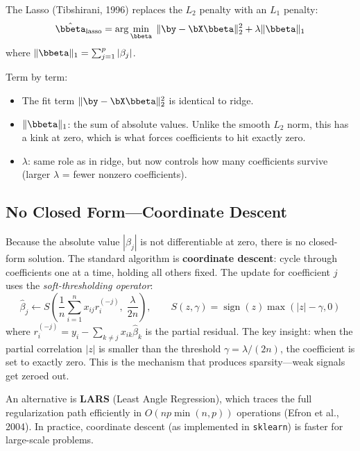 The Lasso (Tibshirani, 1996) replaces the $L_2$ penalty with an $L_1$ penalty:
\begin{equation}
\hat{\bbeta}_{\mathrm{lasso}} = \arg\min_{\bbeta} \; \| \by - \bX \bbeta \|_2^2 + \lambda \| \bbeta \|_1
\label{eq:lasso-objective}
\end{equation}
where $\| \bbeta \|_1 = \sum_{j=1}^p |\beta_j|$.

Term by term:
\begin{itemize}[nosep]
  \item The fit term $\| \by - \bX\bbeta \|_2^2$ is identical to ridge.
  \item $\| \bbeta \|_1$: the sum of absolute values. Unlike the smooth $L_2$ norm, this has a kink at zero, which is what forces coefficients to hit exactly zero.
  \item $\lambda$: same role as in ridge, but now controls how many coefficients survive (larger $\lambda$ = fewer nonzero coefficients).
\end{itemize}

\subsection{No Closed Form---Coordinate Descent}

Because the absolute value $|\beta_j|$ is not differentiable at zero, there is no closed-form solution.
The standard algorithm is \textbf{coordinate descent}: cycle through coefficients one at a time, holding all others fixed.
The update for coefficient $j$ uses the \emph{soft-thresholding operator}:
\begin{equation}
\hat{\beta}_j \leftarrow S\!\left(\frac{1}{n}\sum_{i=1}^n x_{ij} r_i^{(-j)}, \; \frac{\lambda}{2n}\right), \qquad S(z, \gamma) = \operatorname{sign}(z)\max(|z| - \gamma, 0)
\label{eq:soft-threshold}
\end{equation}
where $r_i^{(-j)} = y_i - \sum_{k \neq j} x_{ik}\hat{\beta}_k$ is the partial residual.
The key insight: when the partial correlation $|z|$ is smaller than the threshold $\gamma = \lambda/(2n)$, the coefficient is set to exactly zero.
This is the mechanism that produces sparsity---weak signals get zeroed out.

An alternative is \textbf{LARS} (Least Angle Regression), which traces the full regularization path efficiently in $O(np \min(n,p))$ operations (Efron et al., 2004).
In practice, coordinate descent (as implemented in \texttt{sklearn}) is faster for large-scale problems.

